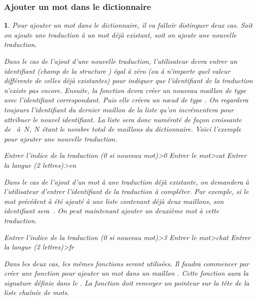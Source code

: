 \documentclass[a4paper]{article}
\newtheorem{Exo}{{\sffamily{Exercice}}}
\begin{document}
			\subsubsection{Ajouter un mot dans le dictionnaire}
				\begin{Exo}\label{exo-AjouterTrad}
					Pour ajouter un mot dans le dictionnaire, il va falloir distinguer deux cas.
					Soit on ajoute une traduction à un mot déjà existant, soit on ajoute une nouvelle traduction.

					Dans le cas de l'ajout d'une nouvelle traduction, l'utilisateur devra entrer un identifiant (champ  de la structure ) égal à zéro (ou à n'importe quel valeur différente de celles déjà existantes) pour indiquer que l'identifiant de la traduction n'existe pas encore.
					Ensuite, la fonction devra créer un nouveau maillon de type  avec l'identifiant correspondant.
					Puis elle créera un nœud de type .
					On regardera toujours l'identifiant du dernier maillon  de la liste qu'on incrémentera pour attribuer le nouvel identifiant.
					La liste sera donc numéroté de façon croissante de~ à~$N$, $N$ étant le nombre total de maillons  du dictionnaire.
					Voici l'exemple pour ajouter une nouvelle traduction.
					\begin{Code*}[language={}]
Entrer l'indice de la traduction (0 si nouveau mot)>0
Entrer le mot>cat
Entrer la langue (2 lettres)>en
					\end{Code*}

					Dans le cas de l'ajout d'un mot à une traduction déjà existante, on demandera à l'utilisateur d'entrer l'identifiant de la traduction à compléter.
					Par exemple, si le mot précédent  à été ajouté à une liste contenant déjà deux maillons, son identifiant sera~.
					On peut maintenant ajouter un deuxième mot à cette traduction.
					\begin{Code*}[language={}]
Entrer l'indice de la traduction (0 si nouveau mot)>3
Entrer le mot>chat
Entrer la langue (2 lettres)>fr
					\end{Code*}

					Dans les deux cas, les mêmes fonctions seront utilisées.
					Il faudra commencer par créer une fonction pour ajouter un mot  dans un maillon .
					Cette fonction aura la signature définie dans le .
					La fonction  doit renvoyer un pointeur sur la tête de la liste chaînée de mots.


\end{Exo}
\end{document}
